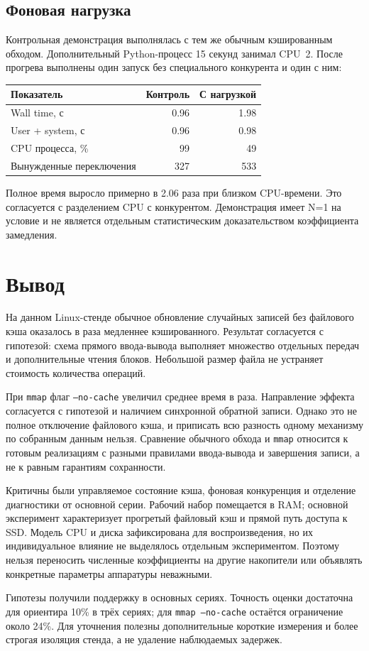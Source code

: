 \subsection{Фоновая нагрузка}
Контрольная демонстрация выполнялась с тем же обычным кэшированным
обходом. Дополнительный Python-процесс 15 секунд занимал CPU~2.
После прогрева выполнены один запуск без специального конкурента
и один с ним:
\begin{center}
\small
\begin{tabular}{|l|r|r|}
\hline
Показатель & Контроль & С нагрузкой\\ \hline
Wall time, с & 0.96 & 1.98\\ \hline
User + system, с & 0.96 & 0.98\\ \hline
CPU процесса, \% & 99 & 49\\ \hline
Вынужденные переключения & 327 & 533\\ \hline
\end{tabular}
\end{center}
Полное время выросло примерно в 2.06 раза при близком CPU-времени.
Это согласуется с разделением CPU с конкурентом.
Демонстрация имеет N=1 на условие и не является отдельным
статистическим доказательством коэффициента замедления.

\section{Вывод}
На данном Linux-стенде обычное обновление случайных записей без
файлового кэша оказалось в \ratioRW{} раза медленнее кэшированного.
Результат согласуется с гипотезой: схема прямого ввода-вывода
выполняет множество отдельных передач и дополнительные чтения
блоков. Небольшой размер файла не устраняет стоимость количества
операций.

При \texttt{mmap} флаг \texttt{--no-cache} увеличил среднее время
в \ratioMmap{} раза. Направление эффекта согласуется с гипотезой
и наличием синхронной обратной записи. Однако это не полное
отключение файлового кэша, и приписать всю разность одному механизму
по собранным данным нельзя. Сравнение обычного обхода и \texttt{mmap}
относится к готовым реализациям с разными правилами ввода-вывода
и завершения записи, а не к равным гарантиям сохранности.

Критичны были управляемое состояние кэша, фоновая конкуренция
и отделение диагностики от основной серии.
Рабочий набор помещается в RAM; основной эксперимент характеризует
прогретый файловый кэш и прямой путь доступа к SSD.
Модель CPU и диска зафиксирована для воспроизведения, но их
индивидуальное влияние не выделялось отдельным экспериментом.
Поэтому нельзя переносить численные коэффициенты на другие
накопители или объявлять конкретные параметры аппаратуры неважными.

Гипотезы получили поддержку в основных сериях.
Точность оценки достаточна для ориентира 10\% в трёх сериях;
для \texttt{mmap --no-cache} остаётся ограничение около 24\%.
Для уточнения полезны дополнительные короткие измерения и более
строгая изоляция стенда, а не удаление наблюдаемых задержек.

